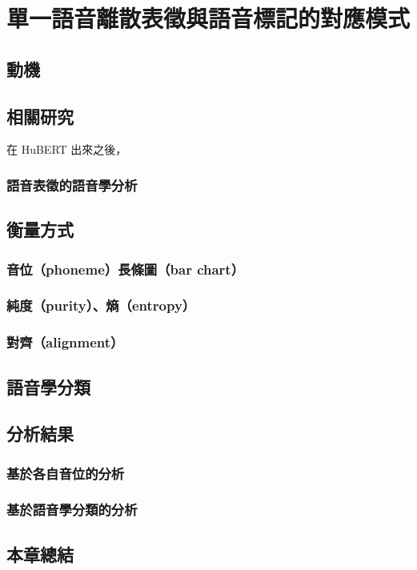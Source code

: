 \chapter{單一語音離散表徵與語音標記的對應模式}
\section{動機}  %
\section{相關研究}

在 HuBERT 出來之後，

\subsection{語音表徵的語音學分析}
\section{衡量方式}
\subsection{音位（phoneme）長條圖（bar chart）}
\subsection{純度（purity）、熵（entropy）}
\subsection{對齊（alignment）}
\section{語音學分類}
\section{分析結果}
\subsection{基於各自音位的分析}
\subsection{基於語音學分類的分析}
\section{本章總結}


